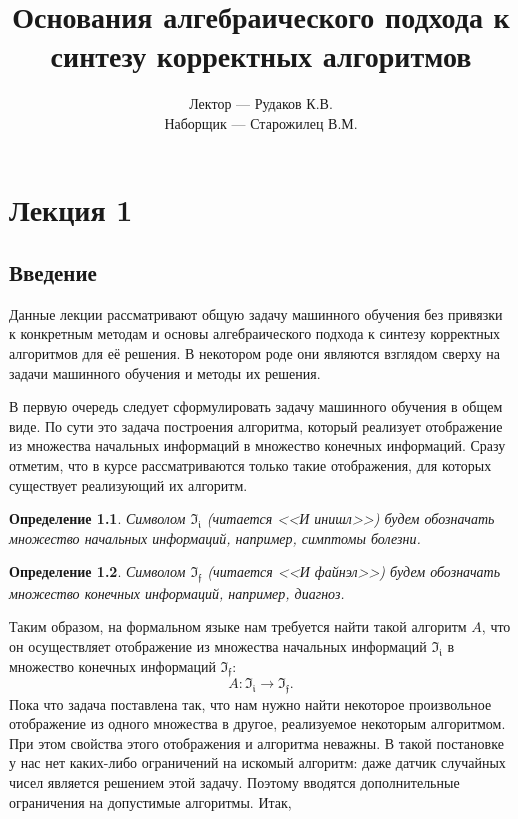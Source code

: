 \documentclass[a4paper, 12pt]{report}
\newtheorem{definition}{Определение}[chapter]
\begin{document}
\title{Основания алгебраического подхода к синтезу корректных алгоритмов}
\author{Лектор --- Рудаков К.В.\\ Наборщик --- Старожилец В.М.}
\date{}
\maketitle

\tableofcontents

\chapter{Лекция 1}
\section{Введение}
Данные лекции рассматривают общую задачу машинного обучения без привязки к конкретным методам и основы алгебраического подхода к синтезу корректных алгоритмов для её решения. В некотором роде они являются взглядом сверху на задачи машинного обучения и методы их решения.

В первую очередь следует сформулировать задачу машинного обучения в общем виде. По сути это задача построения алгоритма, который реализует отображение из множества начальных информаций в множество конечных информаций. Сразу отметим, что в курсе рассматриваются только такие отображения, для которых существует реализующий их алгоритм.

\begin{definition}
Символом $\mathfrak{I_i}$ (читается <<И инишл>>) будем обозначать множество начальных информаций, например, симптомы болезни.
\end{definition}

\begin{definition}
Символом $\mathfrak{I_f}$ (читается <<И файнэл>>) будем обозначать множество конечных информаций, например, диагноз.
\end{definition}

Таким образом, на формальном языке нам требуется найти такой алгоритм $A$, что он осуществляет отображение из множества начальных информаций $\mathfrak{I_i}$ в множество конечных информаций $\mathfrak{I_f}$:
\[
A: \mathfrak{I_i} \rightarrow \mathfrak{I_f}.
\]
Пока что задача поставлена так, что нам нужно найти некоторое произвольное отображение из одного множества в другое, реализуемое некоторым алгоритмом. При этом свойства этого отображения и алгоритма неважны. В такой постановке у нас нет каких-либо ограничений на искомый алгоритм: даже датчик случайных чисел является решением этой задачу. Поэтому вводятся дополнительные ограничения на допустимые алгоритмы. Итак,
\end{document}
